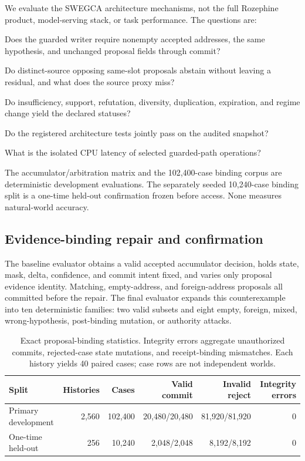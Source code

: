 \documentclass[10pt]{article}
\newcommand{\swegca}{\textsc{SWEGCA}}
\begin{document}
We evaluate the \swegca{} architecture mechanisms, not the full Rozephine product, model-serving stack, or task performance. The questions are:
\begin{description}[leftmargin=1.35in,style=nextline]
  \item[RQ1: Evidence binding.] Does the guarded writer require nonempty accepted addresses, the same hypothesis, and unchanged proposal fields through commit?
  \item[RQ2: Arbitration.] Do distinct-source opposing same-slot proposals abstain without leaving a residual, and what does the source proxy miss?
  \item[RQ3: Accumulation.] Do insufficiency, support, refutation, diversity, duplication, expiration, and regime change yield the declared statuses?
  \item[RQ4: Regression.] Do the registered architecture tests jointly pass on the audited snapshot?
  \item[RQ5: Mechanism cost.] What is the isolated CPU latency of selected guarded-path operations?
\end{description}

The accumulator/arbitration matrix and the 102,400-case binding corpus are deterministic development evaluations. The separately seeded 10,240-case binding split is a one-time held-out confirmation frozen before access. None measures natural-world accuracy.

\subsection{Evidence-binding repair and confirmation}

The baseline evaluator obtains a valid accepted accumulator decision, holds state, mask, delta, confidence, and commit intent fixed, and varies only proposal evidence identity. Matching, empty-address, and foreign-address proposals all committed before the repair. The final evaluator expands this counterexample into ten deterministic families: two valid subsets and eight empty, foreign, mixed, wrong-hypothesis, post-binding mutation, or authority attacks.

\begin{table}[!htbp]
\centering
\small
\begin{tabular}{@{}lrrrrr@{}}
\toprule
Split & Histories & Cases & Valid commit & Invalid reject & Integrity errors \\
\midrule
Primary development & 2,560 & 102,400 & 20,480/20,480 & 81,920/81,920 & 0 \\
One-time held-out & 256 & 10,240 & 2,048/2,048 & 8,192/8,192 & 0 \\
\bottomrule
\end{tabular}
\caption{Exact proposal-binding statistics. Integrity errors aggregate unauthorized commits, rejected-case state mutations, and receipt-binding mismatches. Each history yields 40 paired cases; case rows are not independent worlds.}
\label{tab:binding}
\end{table}
\end{document}
